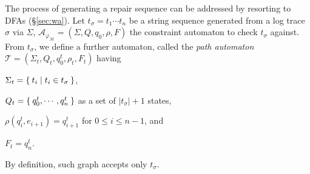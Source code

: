 %

The process of generating a repair sequence can be addressed by resorting to DFAs (\S\ref{sec:wa}). Let $t_\sigma=t_1\cdots t_n$ be a string sequence generated from a log trace $\sigma$ via $\Sigma$, $\mathcal{A}_{\varphi_{\mathcal{M}}}=(\Sigma,Q,q_0,\rho,F)$ the constraint automaton to check $t_\sigma$ against. From $t_\sigma$, we define a further automaton, called the \textit{path automaton} $\mathcal{T}=(\Sigma_t,Q_t,q_0^t,\rho_t,F_t)$ having \begin{enumerate*}[label=\emph{\alph*})]
	\item $\Sigma_t=\Set{t_i|t_i\in t_\sigma}$,
	\item $Q_t=\Set{q_0^t,\cdots,q_n^t}$ as a set of $|t_\sigma|+1$ states,
	\item $\rho(q_i^t,e_{i+1})=q_{i+1}^t$ for $0\leq i\leq n-1$,
	and
	\item $F_t={q_n^t}$.
\end{enumerate*} By definition, such graph accepts only $t_\sigma$.

